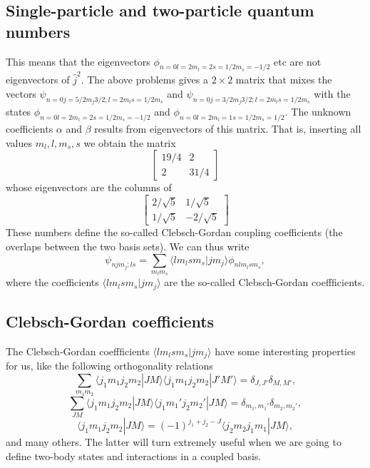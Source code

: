 \documentclass[%
twoside,                 %
final,                   %
10pt]{article}
\begin{document}
\subsection{Single-particle and two-particle quantum numbers}
\begin{block}{}
This means that the eigenvectors $\phi_{n=0l=2m_l=2s=1/2m_s=-1/2}$ etc are not eigenvectors of $\hat{j}^2$. The above problems gives a $2\times2$ matrix that mixes the vectors $\psi_{n=0j=5/2m_j3/2;l=2m_ls=1/2m_s}$ and $\psi_{n=0j=3/2m_j3/2;l=2m_ls=1/2m_s}$ with the states  $\phi_{n=0l=2m_l=2s=1/2m_s=-1/2}$ and
$\phi_{n=0l=2m_l=1s=1/2m_s=1/2}$. The unknown coefficients $\alpha$ and $\beta$ results from eigenvectors of this matrix. That is, inserting all values $m_l,l,m_s,s$ we obtain the matrix 
\[
\left[ \begin{array} {cc} 19/4 & 2 \\ 2 & 31/4 \end{array} \right]\]
whose eigenvectors are the columns of
\[
\left[ \begin{array} {cc} 2/\sqrt{5} &1/\sqrt{5}  \\ 1/\sqrt{5} & -2/\sqrt{5} \end{array}\right]\]  
These numbers define the so-called Clebsch-Gordan coupling coefficients  (the overlaps between the two basis sets). We can thus write
\[
\psi_{njm_j;ls}=\sum_{m_lm_s}\langle lm_lsm_s|jm_j\rangle\phi_{nlm_lsm_s},
\]
where the coefficients $\langle lm_lsm_s|jm_j\rangle$ are the so-called Clebsch-Gordan coeffficients.
\end{block}

\subsection{Clebsch-Gordan coefficients}
\begin{block}{}
The Clebsch-Gordan coeffficients $\langle lm_lsm_s|jm_j\rangle$ have some interesting properties for us, like the following  orthogonality relations
\[
\sum_{m_1m_2}\langle j_1m_1j_2m_2|JM\rangle\langle j_1m_1j_2m_2|J'M'\rangle=\delta_{J,J'}\delta_{M,M'},
\]
\[
\sum_{JM}\langle j_1m_1j_2m_2|JM\rangle\langle j_1m_1'j_2m_2'|JM\rangle=\delta_{m_1,m_1'}\delta_{m_2,m_2'},
\]
\[
\langle j_1m_1j_2m_2|JM\rangle=(-1)^{j_1+j_2-J}\langle j_2m_2j_1m_1|JM\rangle,
\]
and many others. The latter will turn extremely useful when we are going to define two-body states and interactions in a coupled basis.
\end{block}
\end{document}
